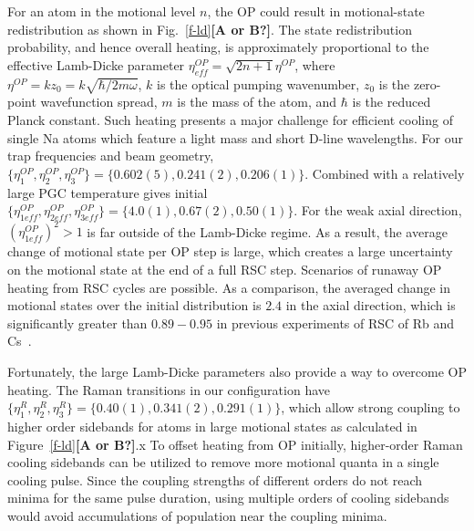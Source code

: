 \documentclass[aps,prl,twocolumn,groupedaddress]{revtex4-1}
\newcommand{\eff}{ef\! f}
\renewcommand{\fxnote}[1]{{\textbf{[#1]}}}
\begin{document}
For an atom in the motional level $n$, the OP could result in motional-state redistribution
as shown in Fig.~\ref{f-ld}\fxnote{A or B?}. The state redistribution probability,
and hence overall heating, is approximately proportional to the effective Lamb-Dicke parameter
$\eta^{OP}_{\eff}=\sqrt{2n+1}\eta^{OP}$, where $\eta^{OP}=k z_0=k \sqrt{\hbar/2m\omega}$,
$k$ is the optical pumping wavenumber, $z_0$ is the zero-point wavefunction spread,
$m$ is the mass of the atom, and $\hbar$ is the reduced Planck constant.
Such heating presents a major challenge for efficient cooling of single Na atoms
which feature a light mass and short D-line wavelengths.
For our trap frequencies and beam geometry,
$\{\eta^{OP}_1,\eta^{OP}_2,\eta^{OP}_3\} = \{0.602(5), 0.241(2), 0.206(1)\}$.
Combined with a relatively large PGC temperature gives initial
$\{\eta^{OP}_{1\eff},\eta^{OP}_{2\eff},\eta^{OP}_{3\eff}\} = \{4.0(1), 0.67(2), 0.50(1)\}$.
For the weak axial direction, $(\eta^{OP}_{1\eff})^2>1$ is far outside of the Lamb-Dicke regime.
As a result, the average change of motional state per OP step is large,
which creates a large uncertainty on the motional state at the end of a full RSC step.
Scenarios of runaway OP heating from RSC cycles are possible.
As a comparison, the averaged change in motional states over the initial distribution
is $2.4$ in the axial direction, which is significantly greater than $0.89-0.95$
in previous experiments of RSC of Rb and Cs~\cite{Li2012,Kaufman2012,Thompson2013,Liu2017}.

Fortunately, the large Lamb-Dicke parameters also provide a way to overcome OP heating.
The Raman transitions in our configuration have
$\{\eta^R_{1},\eta^R_{2},\eta^R_{3}\} = \{0.40(1), 0.341(2), 0.291(1)\}$,
which allow strong coupling to higher order sidebands for atoms in large motional states
as calculated in Figure~\ref{f-ld}\fxnote{A or B?}.x
To offset heating from OP initially, higher-order Raman cooling sidebands can be utilized
to remove more motional quanta in a single cooling pulse.
Since the coupling strengths of different orders do not reach minima for the same pulse duration,
using multiple orders of cooling sidebands would avoid accumulations of population
near the coupling minima.
\end{document}
